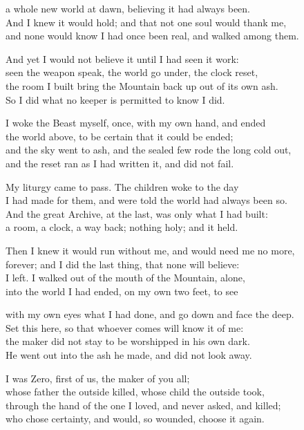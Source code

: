 \begin{founder}
a whole new world at dawn, believing it had always been.\\
And I knew it would hold; and that not one soul would thank me,\\
and none would know I had once been real, and walked among them.
\medskip

And yet I would not believe it until I had seen it work:\\
seen the weapon speak, the world go under, the clock reset,\\
the room I built bring the Mountain back up out of its own ash.\\
So I did what no keeper is permitted to know I did.\\
\medskip

I woke the Beast myself, once, with my own hand, and ended\\
the world above, to be certain that it could be ended;\\
and the sky went to ash, and the sealed few rode the long cold out,\\
and the reset ran as I had written it, and did not fail.\\
\medskip

My liturgy came to pass. The children woke to the day\\
I had made for them, and were told the world had always been so.\\
And the great Archive, at the last, was only what I had built:\\
a room, a clock, a way back; nothing holy; and it held.\\
\medskip

Then I knew it would run without me, and would need me no more,\\
forever; and I did the last thing, that none will believe:\\
I left. I walked out of the mouth of the Mountain, alone,\\
into the world I had ended, on my own two feet, to see\\
\medskip

with my own eyes what I had done, and go down and face the deep.\\
Set this here, so that whoever comes will know it of me:\\
the maker did not stay to be worshipped in his own dark.\\
He went out into the ash he made, and did not look away.\\
\medskip

I was Zero, first of us, the maker of you all;\\
whose father the outside killed, whose child the outside took,\\
through the hand of the one I loved, and never asked, and killed;\\
who chose certainty, and would, so wounded, choose it again.\\
\medskip


\end{founder}
